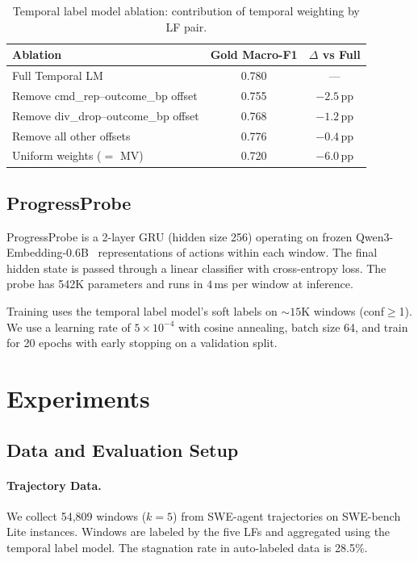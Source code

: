 \documentclass[11pt]{article}
\begin{document}
\begin{table}[t]
\centering
\caption{Temporal label model ablation: contribution of temporal weighting by LF pair.}
\label{tab:temporal_ablation}
\small
\begin{tabular}{lcc}
\toprule
Ablation & Gold Macro-F1 & $\Delta$ vs Full \\
\midrule
Full Temporal LM & 0.780 & --- \\
Remove cmd\_rep--outcome\_bp offset & 0.755 & $-2.5$\,pp \\
Remove div\_drop--outcome\_bp offset & 0.768 & $-1.2$\,pp \\
Remove all other offsets & 0.776 & $-0.4$\,pp \\
Uniform weights ($=$ MV) & 0.720 & $-6.0$\,pp \\
\bottomrule
\end{tabular}
\end{table}

\subsection{ProgressProbe}
\label{sec:probe}

ProgressProbe is a 2-layer GRU (hidden size 256) operating on frozen Qwen3-Embedding-0.6B~\citep{qwen3embedding} representations of actions within each window.
The final hidden state is passed through a linear classifier with cross-entropy loss.
The probe has 542K parameters and runs in $4$\,ms per window at inference.

Training uses the temporal label model's soft labels on ${\sim}15$K windows (conf$\geq$1).
We use a learning rate of $5 \times 10^{-4}$ with cosine annealing, batch size 64, and train for 20 epochs with early stopping on a validation split.

\section{Experiments}
\label{sec:experiments}

\subsection{Data and Evaluation Setup}

\paragraph{Trajectory Data.}
We collect 54,809 windows ($k=5$) from SWE-agent trajectories on SWE-bench Lite instances.
Windows are labeled by the five LFs and aggregated using the temporal label model.
The stagnation rate in auto-labeled data is 28.5\%.
\end{document}
